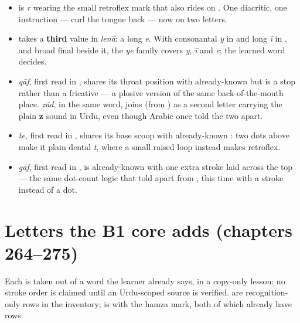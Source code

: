 \begin{itemize}
  \item \textbf{} is \textbf{} \emph{r} wearing the small retroflex mark that also rides on \textbf{}. One diacritic, one instruction — curl the tongue back — now on two letters.
  \item \textbf{} takes a \textbf{third} value in \textbf{} \emph{lenā}: a long \emph{e}. With consonantal \emph{y} in \textbf{} and long \emph{ī} in \textbf{}, and broad final \textbf{} beside it, the \emph{ye} family covers \emph{y}, \emph{ī} and \emph{e}; the learned word decides.
  \item \textbf{} \emph{qāf}, first read in \textbf{}, shares its throat position with already-known \textbf{} but is a stop rather than a fricative — a plosive version of the same back-of-the-mouth place. \textbf{} \emph{zād}, in the same word, joins \textbf{} (from \textbf{}) as a second letter carrying the plain \textbf{z} sound in Urdu, even though Arabic once told the two apart.
  \item \textbf{} \emph{te}, first read in \textbf{}, shares its base scoop with already-known \textbf{}: two dots above make it plain dental \emph{t}, where a small raised loop instead makes \textbf{} retroflex.
  \item \textbf{} \emph{gāf}, first read in \textbf{}, is already-known \textbf{} with one extra stroke laid across the top — the same dot-count logic that told \textbf{} apart from \textbf{}, this time with a stroke instead of a dot.
\end{itemize}

\section*{Letters the B1 core adds (chapters 264–275)}

Each is taken out of a word the learner already says, in a copy-only lesson: no stroke order is claimed until an Urdu-scoped source is verified.       are recognition-only rows in the inventory;  is  with the hamza mark, both of which already have rows.

